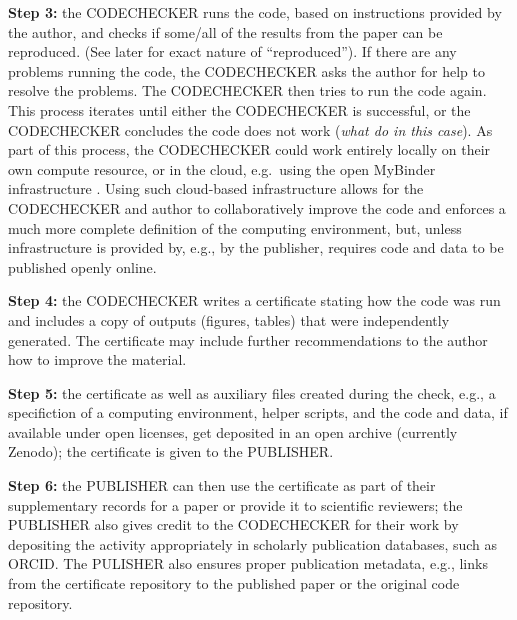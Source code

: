 \documentclass[12pt]{article}
\begin{document}
\textbf{Step 3:} the CODECHECKER runs the code, based on instructions provided by
the author, and checks if some/all of the results from the paper can be
reproduced. (See later for exact nature of ``reproduced''). If there are
any problems running the code, the CODECHECKER asks the author for help
to resolve the problems. The CODECHECKER then tries to run the code
again. This process iterates until either the CODECHECKER is successful,
or the CODECHECKER concludes the code does not work (\emph{what do in this
case}). As part of this process, the CODECHECKER could work entirely
locally on their own compute resource, or in the cloud, e.g.~using the open
MyBinder infrastructure \cite{jupyter_binder_2018}. Using such cloud-based 
infrastructure allows for the CODECHECKER and author to collaboratively improve
the code and enforces a much more complete definition of the computing environment,
but, unless infrastructure is provided by, e.g., by the publisher, requires code
and data to be published openly online.

\textbf{Step 4:} the CODECHECKER writes a certificate stating how the code was
run and includes a copy of outputs (figures, tables) that were
independently generated. The certificate may include further recommendations to
the author how to improve the material.

\textbf{Step 5:} the certificate as well as auxiliary files created during the check,
e.g., a specifiction of a computing environment, helper scripts, and the code and data,
if available under open licenses, get deposited in an open archive (currently Zenodo);
the certificate is given to the PUBLISHER.

\textbf{Step 6:} the PUBLISHER can then use the certificate as part of their
supplementary records for a paper or provide it to scientific reviewers; the
PUBLISHER also gives credit to the CODECHECKER for their work by depositing the
activity appropriately in scholarly publication databases, such as ORCID.
The PULISHER also ensures proper publication metadata, e.g., links from the 
certificate repository to the published paper or the original code repository.
\end{document}
